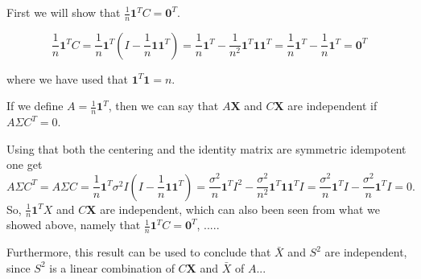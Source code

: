First we will show that $\frac{1}{n}\textbf{1}^T C = \textbf{0}^T$. 

$$\frac{1}{n}\textbf{1}^T C = \frac{1}{n} \textbf{1}^T \left(I - \frac{1}{n} \textbf{1}\textbf{1}^T\right) = \frac{1}{n} \textbf{1}^T - \frac{1}{n^2} \textbf{1}^T \textbf{1}\textbf{1}^T = \frac{1}{n} \textbf{1}^T - \frac{1}{n} \textbf{1}^T = \textbf{0}^T$$

where we have used that $\textbf{1}^T \textbf{1} = n$.

If we define $A = \frac{1}{n} \textbf{1}^T$, then we can say that $A \textbf{X}$ and $C \textbf{X}$ are independent if $A \Sigma C^T = 0$.

Using that both the centering and the identity matrix are symmetric idempotent one get
$$ 
A \Sigma C^T = A \Sigma C =  \frac{1}{n} \textbf{1}^T \sigma^2 I (I - \frac{1}{n} \textbf{1}\textbf{1}^T) = \frac{ \sigma^2}{n} \textbf{1}^T I^2 - \frac{\sigma^2}{n^2}  \textbf{1}^T  \textbf{1}\textbf{1}^T I =  \frac{ \sigma^2}{n} \textbf{1}^T I - \frac{ \sigma^2}{n} \textbf{1}^T I = 0.
$$
So, $\frac{1}{n} \textbf{1}^T X$ and $C\textbf{X}$ are independent, which can also been seen from what we showed above, namely that $\frac{1}{n} \textbf{1}^T C = \textbf{0}^T $, .....

Furthermore, this result can be used to conclude that $\bar X$ and $S^2$ are independent, since $S^2$ is a linear combination of $C\textbf{X}$ and $\bar X$ of $A$...




